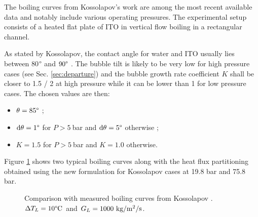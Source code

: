 The boiling curves from Kossolapov's work \cite{kossolapov_experimental_2021} are among the most recent available data and notably include various operating pressures. The experimental setup consists of a heated flat plate of ITO in vertical flow boiling in a rectangular channel.


\npar

As stated by Kossolapov, the contact angle for water and ITO usually lies between 80$\degree$ and $90\degree$ \cite{kossolapov_experimental_2021}. The bubble tilt is likely to be very low for high pressure cases (see Sec. \ref{sec:departure}) and the bubble growth rate coefficient $K$ shall be closer to 1.5 / 2 at high pressure while it can be lower than 1 for low pressure cases. The chosen values are then:

\begin{itemize}
\item $\theta = 85 \degree$ ;
\item $\mathrm{d}\theta = 1 \degree$ for $P > 5\ $bar and $\mathrm{d}\theta = 5 \degree$ otherwise ;
\item $K = 1.5$ for $P > 5\ $bar and $K=1.0$ otherwise.
\end{itemize}


Figure \ref{fig:HFP_koss_BC} shows two typical boiling curves along with the heat flux partitioning obtained using the new formulation for Kossolapov cases at 19.8 bar and 75.8 bar.


\begin{figure}[!h]
\centering
{}
\caption{Comparison with measured boiling curves from Kossolapov \cite{kossolapov_experimental_2021}. $\Delta T_{L}=10\degree\mathrm{C}$ and $G_{L}=1000~\text{kg/m$^{2}$/s}$.}
\label{fig:HFP_koss_BC}
\end{figure}


